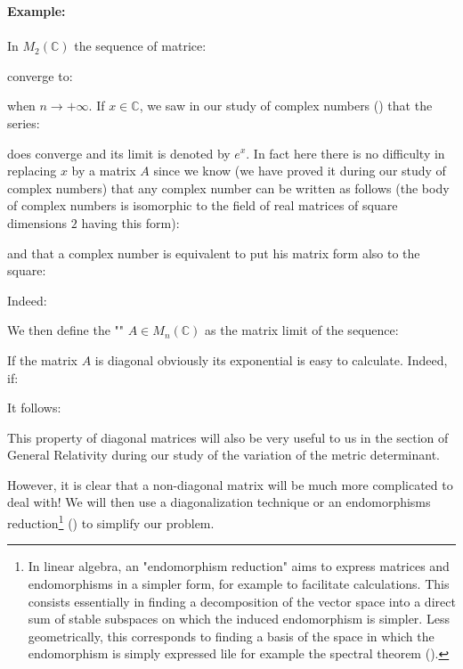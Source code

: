 	\begin{tcolorbox}[colframe=black,colback=white,sharp corners]
	\textbf{{\Large {}}Example:}\\\\
	In $M_2(\mathbb{C})$ the sequence of matrice:
	
	converge to:
	
	when $n\rightarrow +\infty$.
	If $x\in \mathbb{C}$, we saw in our study of complex numbers () that the series:	
	
	does converge and its limit is denoted by $e^x$. In fact here there is no difficulty in replacing $x$ by a matrix $A$ since we know (we have proved it during our study of complex numbers) that any complex number can be written as follows (the body of complex numbers is isomorphic to the field of real matrices of square dimensions $2$ having this form):
	
	\end{tcolorbox}
	\pagebreak
	\begin{tcolorbox}[colframe=black,colback=white,sharp corners]
	and that a complex number is equivalent to put his matrix form also to the square:
	
	Indeed:
	
	\end{tcolorbox}
	We then define the "\label{exponential of a matrix}" $A\in M_n(\mathbb{C})$ as the matrix limit of the sequence:
	
	If the matrix $A$ is diagonal obviously its exponential is easy to calculate. Indeed, if:
	
	It follows:
	
	This property of diagonal matrices will also be very useful to us in the section of General Relativity during our study of the variation of the metric determinant.
	
	However, it is clear that a non-diagonal matrix will be much more complicated to deal with! We will then use a diagonalization technique or an endomorphisms reduction\footnote{In linear algebra, an "endomorphism reduction" aims to express matrices and endomorphisms in a simpler form, for example to facilitate calculations. This consists essentially in finding a decomposition of the vector space into a direct sum of stable subspaces on which the induced endomorphism is simpler. Less geometrically, this corresponds to finding a basis of the space in which the endomorphism is simply expressed lile for example the spectral theorem ().} () to simplify our problem.
	
